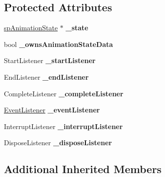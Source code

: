 \subsection*{Protected Attributes}
\begin{DoxyCompactItemize}
\item 
\mbox{\label{classspine_1_1SkeletonAnimation_a0763b015b61e05c5584b6d824b6073e6}} 
\hyperlink{structspAnimationState}{sp\+Animation\+State} $\ast$ {\bfseries \+\_\+state}
\item 
\mbox{\label{classspine_1_1SkeletonAnimation_a8fb6b137c76671927256ed877e91b7c5}} 
bool {\bfseries \+\_\+owns\+Animation\+State\+Data}
\item 
\mbox{\label{classspine_1_1SkeletonAnimation_add6937617b4a26ea5161e31e7f630d12}} 
Start\+Listener {\bfseries \+\_\+start\+Listener}
\item 
\mbox{\label{classspine_1_1SkeletonAnimation_a8525ae51b0edd215fe6c9c790f166d92}} 
End\+Listener {\bfseries \+\_\+end\+Listener}
\item 
\mbox{\label{classspine_1_1SkeletonAnimation_aab7aef711a20487a21f781947d0b156d}} 
Complete\+Listener {\bfseries \+\_\+complete\+Listener}
\item 
\mbox{\label{classspine_1_1SkeletonAnimation_affc926340bed063d536d9ec30f3b6ea2}} 
\hyperlink{classEventListener}{Event\+Listener} {\bfseries \+\_\+event\+Listener}
\item 
\mbox{\label{classspine_1_1SkeletonAnimation_a26974d75d48f99e9ba5eb5b7c39384ad}} 
Interrupt\+Listener {\bfseries \+\_\+interrupt\+Listener}
\item 
\mbox{\label{classspine_1_1SkeletonAnimation_af91827e760601e6d9c2c21a52d68d026}} 
Dispose\+Listener {\bfseries \+\_\+dispose\+Listener}
\end{DoxyCompactItemize}
\subsection*{Additional Inherited Members}


